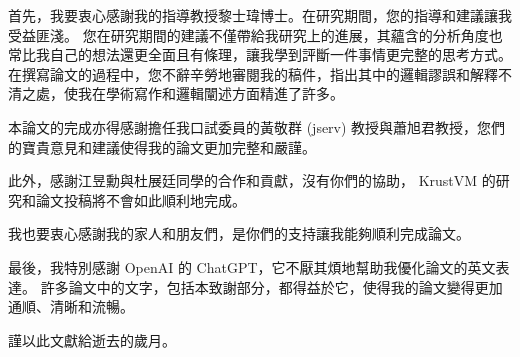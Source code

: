 
\begin{acknowledgement}

%
%
%
%
%

首先，我要衷心感謝我的指導教授黎士瑋博士。在研究期間，您的指導和建議讓我受益匪淺。
您在研究期間的建議不僅帶給我研究上的進展，其蘊含的分析角度也常比我自己的想法還更全面且有條理，讓我學到評斷一件事情更完整的思考方式。
在撰寫論文的過程中，您不辭辛勞地審閱我的稿件，指出其中的邏輯謬誤和解釋不清之處，使我在學術寫作和邏輯闡述方面精進了許多。

本論文的完成亦得感謝擔任我口試委員的黃敬群 (jserv) 教授與蕭旭君教授，您們的寶貴意見和建議使得我的論文更加完整和嚴謹。

此外，感謝江昱勳與杜展廷同學的合作和貢獻，沒有你們的協助， KrustVM 的研究和論文投稿將不會如此順利地完成。

我也要衷心感謝我的家人和朋友們，是你們的支持讓我能夠順利完成論文。

最後，我特別感謝 OpenAI 的 ChatGPT，它不厭其煩地幫助我優化論文的英文表達。
許多論文中的文字，包括本致謝部分，都得益於它，使得我的論文變得更加通順、清晰和流暢。

謹以此文獻給逝去的歲月。

\end{acknowledgement}
